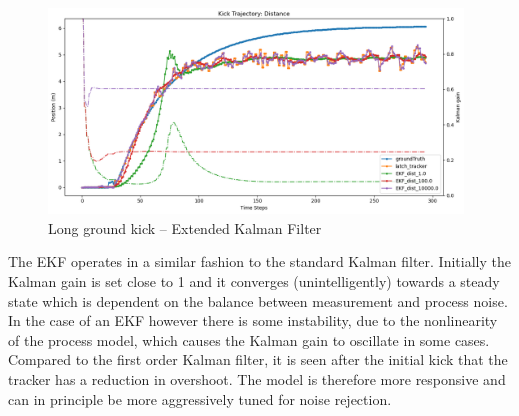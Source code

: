\documentclass[a4paper,twoside,12pt]{report}
\begin{document}
\begin{figure}[h!]
\begin{center}
\includegraphics[width=11cm]{images/ekf_ground_long.png}
\caption{Long ground kick -- Extended Kalman Filter}
\label{fig:ekfgroundlong}
\end{center}
\end{figure}



The EKF operates in a similar fashion to the standard Kalman filter. Initially the Kalman gain is set close to 1 and it converges (unintelligently) towards a steady state which is dependent on the balance between measurement and process noise. In the case of an EKF however there is some instability, due to the nonlinearity of the process model, which causes the Kalman gain to oscillate in some cases. Compared to the first order Kalman filter, it is seen after the initial kick that the tracker has a reduction in overshoot. The model is therefore more responsive and can in principle be more aggressively tuned for noise rejection.
\end{document}
